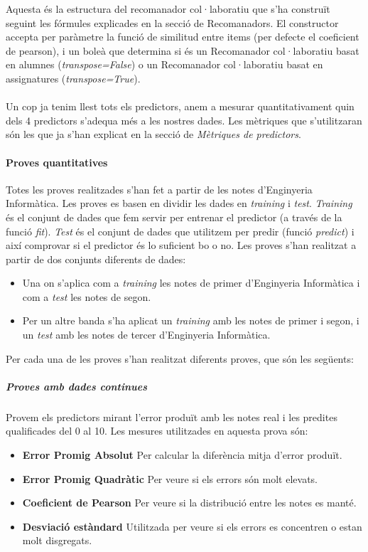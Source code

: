 \documentclass[12pt,a4paper,catalan]{article}
\begin{document}
Aquesta és la estructura del recomanador col·laboratiu que s'ha construït seguint les fórmules explicades en la secció de Recomanadors. El constructor accepta per paràmetre la funció de similitud entre items (per defecte el coeficient de pearson), i un boleà que determina si és un Recomanador col·laboratiu basat en alumnes (\textit{transpose=False}) o un Recomanador col·laboratiu basat en assignatures (\textit{transpose=True}).
\\
\\
Un cop ja tenim llest tots els predictors, anem a mesurar quantitativament quin dels 4 predictors s'adequa més a les nostres dades. Les mètriques que s'utilitzaran són les que ja s'han explicat en la secció de \textit{Mètriques de predictors}.

\paragraph{Proves quantitatives}
Totes les proves realitzades s'han fet a partir de les notes d'Enginyeria Informàtica. Les proves es basen en dividir les dades en \textit{training} i \textit{test}. \textit{Training} és el conjunt de dades que fem servir per entrenar el predictor (a través de la funció \textit{fit}). \textit{Test} és el conjunt de dades que utilitzem per predir (funció \textit{predict}) i així comprovar si el predictor és lo suficient bo o no. Les proves s'han realitzat a partir de dos conjunts diferents de dades:

\begin{itemize}[leftmargin=.5in]
	\item Una on s'aplica com a \textit{training} les notes de primer d'Enginyeria Informàtica i com a \textit{test} les notes de segon.
	\item Per un altre banda s'ha aplicat un \textit{training} amb les notes de primer i segon, i un \textit{test} amb les notes de tercer d'Enginyeria Informàtica.
\end{itemize}

Per cada una de les proves s'han realitzat diferents proves, que són les següents:

\subparagraph{Proves amb dades continues}
Provem els predictors mirant l'error produït amb les notes real i les predites qualificades del 0 al 10. Les mesures utilitzades en aquesta prova són:

\begin{itemize}[leftmargin=.5in]
	\item \textbf{Error Promig Absolut} Per calcular la diferència mitja d'error produït.
	\item \textbf{Error Promig Quadràtic} Per veure si els errors són molt elevats.
	\item \textbf{Coeficient de Pearson} Per veure si la distribució entre les notes es manté.
	\item \textbf{Desviació estàndard} Utilitzada per veure si els errors es concentren o estan molt disgregats.
\end{itemize}
\end{document}
